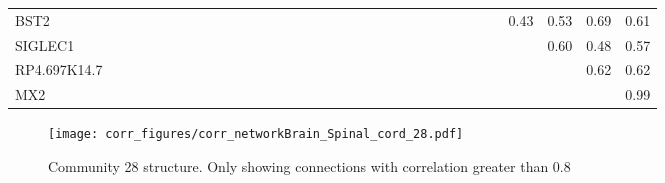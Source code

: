 \begin{longtable}{lrrrrrrrrrrrrrrrrrrrrrrrrrrrrrrrr}
BST2         &            &              &             &             &             &               &             &             &              &             &             &             &              &              &            &             &             &             &            &            &            &            &            &              &            &             &            &            &          0.43 &               0.53 &      0.69 &      0.61 \\
SIGLEC1      &            &              &             &             &             &               &             &             &              &             &             &             &              &              &            &             &             &             &            &            &            &            &            &              &            &             &            &            &               &               0.60 &      0.48 &      0.57 \\
RP4.697K14.7 &            &              &             &             &             &               &             &             &              &             &             &             &              &              &            &             &             &             &            &            &            &            &            &              &            &             &            &            &               &                    &      0.62 &      0.62 \\
MX2          &            &              &             &             &             &               &             &             &              &             &             &             &              &              &            &             &             &             &            &            &            &            &            &              &            &             &            &            &               &                    &           &      0.99 \\
\end{longtable}


\begin{figure}[h!]
\centering
\texttt{[image: corr\_figures/corr\_networkBrain\_Spinal\_cord\_28.pdf]}
\caption{Community 28 structure. Only showing connections with correlation greater than 0.8}
\end{figure}




